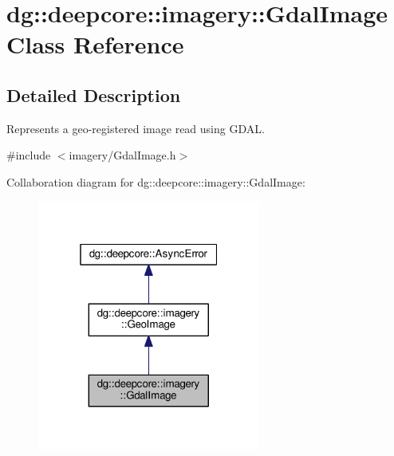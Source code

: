 \hypertarget{classdg_1_1deepcore_1_1imagery_1_1_gdal_image}{}\section{dg\+:\+:deepcore\+:\+:imagery\+:\+:Gdal\+Image Class Reference}
\label{classdg_1_1deepcore_1_1imagery_1_1_gdal_image}


\subsection{Detailed Description}
Represents a geo-\/registered image read using G\+D\+AL. 

{\ttfamily \#include $<$imagery/\+Gdal\+Image.\+h$>$}



Collaboration diagram for dg\+:\+:deepcore\+:\+:imagery\+:\+:Gdal\+Image\+:
\nopagebreak
\begin{figure}[H]
\begin{center}
\leavevmode
\includegraphics[width=208pt]{classdg_1_1deepcore_1_1imagery_1_1_gdal_image__coll__graph}
\end{center}
\end{figure}
